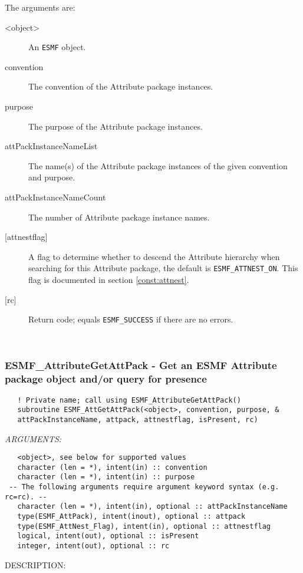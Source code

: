    The arguments are:
   \begin{description}
   \item [<object>]
   An {\tt ESMF} object.
   \item [convention]
   The convention of the Attribute package instances.
   \item [purpose]
   The purpose of the Attribute package instances.
   \item [attPackInstanceNameList]
   The name(s) of the Attribute package instances of the given
   convention and purpose.
   \item [attPackInstanceNameCount]
   The number of Attribute package instance names.
   \item [{[attnestflag]}]
   A flag to determine whether to descend the
   Attribute hierarchy when searching for this Attribute package,
   the default is {\tt ESMF\_ATTNEST\_ON}. This flag is documented
   in section \ref{const:attnest}.
   \item [{[rc]}]
   Return code; equals {\tt ESMF\_SUCCESS} if there are no errors.
   \end{description}
  
   
 
\mbox{}\hrulefill\ 
 
\subsubsection [ESMF\_AttributeGetAttPack] {ESMF\_AttributeGetAttPack - Get an ESMF Attribute package object and/or query for presence}


  
\begin{verbatim}   ! Private name; call using ESMF_AttributeGetAttPack()
   subroutine ESMF_AttGetAttPack(<object>, convention, purpose, &
   attPackInstanceName, attpack, attnestflag, isPresent, rc)\end{verbatim}{\em ARGUMENTS:}
\begin{verbatim}   <object>, see below for supported values
   character (len = *), intent(in) :: convention
   character (len = *), intent(in) :: purpose
 -- The following arguments require argument keyword syntax (e.g. rc=rc). --
   character (len = *), intent(in), optional :: attPackInstanceName
   type(ESMF_AttPack), intent(inout), optional :: attpack
   type(ESMF_AttNest_Flag), intent(in), optional :: attnestflag
   logical, intent(out), optional :: isPresent
   integer, intent(out), optional :: rc\end{verbatim}
{\sf DESCRIPTION:\\ }


